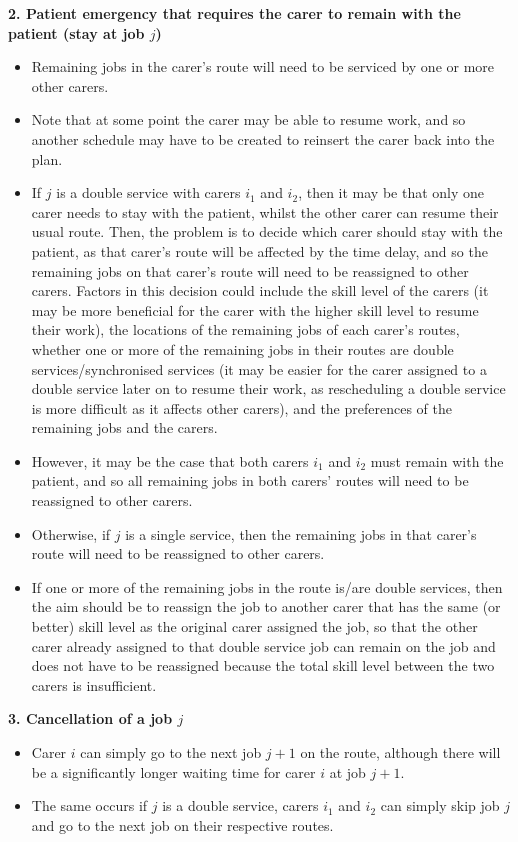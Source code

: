 \documentclass[a4paper]{article}
\begin{document}
\noindent \textbf{2. Patient emergency that requires the carer to remain with the patient (stay at job $j$)}
\begin{itemize}[label=\textcolor{myOrange}{\textbullet},leftmargin=*, itemsep=-0.1em]
	\item Remaining jobs in the carer's route will need to be serviced by one or more other carers.
	\item Note that at some point the carer may be able to resume work, and so another schedule may have to be created to reinsert the carer back into the plan.
	\item If $j$ is a double service with carers $i_1$ and $i_2$, then it may be that only one carer needs to stay with the patient, whilst the other carer can resume their usual route. Then, the problem is to decide which carer should stay with the patient, as that carer's route will be affected by the time delay, and so the remaining jobs on that carer's route will need to be reassigned to other carers. Factors in this decision could include the skill level of the carers (it may be more beneficial for the carer with the higher skill level to resume their work), the locations of the remaining jobs of each carer's routes, whether one or more of the remaining jobs in their routes are double services/synchronised services (it may be easier for the carer assigned to a double service later on to resume their work, as rescheduling a double service is more difficult as it affects other carers), and the preferences of the remaining jobs and the carers.
	\item However, it may be the case that both carers $i_1$ and $i_2$ must remain with the patient, and so all remaining jobs in both carers' routes will need to be reassigned to other carers.
	\item Otherwise, if $j$ is a single service, then the remaining jobs in that carer's route will need to be reassigned to other carers.
	\item If one or more of the remaining jobs in the route is/are double services, then the aim should be to reassign the job to another carer that has the same (or better) skill level as the original carer assigned the job, so that the other carer already assigned to that double service job can remain on the job and does not have to be reassigned because the total skill level between the two carers is insufficient.
\end{itemize}

\noindent \textbf{3. Cancellation of a job $j$}
\begin{itemize}[label=\textcolor{myYellow}{\textbullet},leftmargin=*, itemsep=-0.1em]
	\item Carer $i$ can simply go to the next job $j+1$ on the route, although there will be a significantly longer waiting time for carer $i$ at job $j+1$. 
	\item The same occurs if $j$ is a double service, carers $i_1$ and $i_2$ can simply skip job $j$ and go to the next job on their respective routes.
\end{itemize}
\end{document}
